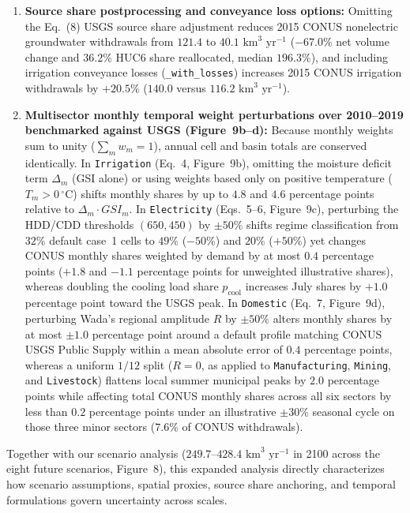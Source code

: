 \documentclass[11pt,letterpaper]{article}
\begin{document}
{\begin{enumerate}[label=\arabic*), leftmargin=1.6em, topsep=2pt, itemsep=2pt]
\begin{itemize}[leftmargin=1.4em, topsep=1pt, itemsep=1pt]
  \end{itemize}
  \item \textbf{Source share postprocessing and conveyance loss options:} Omitting the Eq.~(8) USGS source share adjustment reduces 2015 CONUS nonelectric groundwater withdrawals from $121.4$ to $40.1\text{ km}^3\text{ yr}^{-1}$ ($-67.0\%$ net volume change and $36.2\%$ HUC6 share reallocated, median $196.3\%$), and including irrigation conveyance losses (\texttt{\_with\_losses}) increases 2015 CONUS irrigation withdrawals by $+20.5\%$ ($140.0$ versus $116.2\text{ km}^3\text{ yr}^{-1}$).
  \item \textbf{Multisector monthly temporal weight perturbations over 2010--2019 benchmarked against USGS (Figure~9b--d):} Because monthly weights sum to unity ($\sum_m w_m = 1$), annual cell and basin totals are conserved identically. In \texttt{Irrigation} (Eq.~4, Figure~9b), omitting the moisture deficit term $\Delta_m$ (GSI alone) or using weights based only on positive temperature ($T_m > 0\,^{\circ}\mathrm{C}$) shifts monthly shares by up to $4.8$ and $4.6$ percentage points relative to $\Delta_m \cdot GSI_m$. In \texttt{Electricity} (Eqs.~5--6, Figure~9c), perturbing the HDD/CDD thresholds $(650, 450)$ by $\pm 50\%$ shifts regime classification from $32\%$ default case~1 cells to $49\%$ ($-50\%$) and $20\%$ ($+50\%$) yet changes CONUS monthly shares weighted by demand by at most $0.4$ percentage points ($+1.8$ and $-1.1$ percentage points for unweighted illustrative shares), whereas doubling the cooling load share $p_{\mathrm{cool}}$ increases July shares by $+1.0$ percentage point toward the USGS peak. In \texttt{Domestic} (Eq.~7, Figure~9d), perturbing Wada's regional amplitude $R$ by $\pm 50\%$ alters monthly shares by at most $\pm 1.0$ percentage point around a default profile matching CONUS USGS Public Supply within a mean absolute error of $0.4$ percentage points, whereas a uniform $1/12$ split ($R=0$, as applied to \texttt{Manufacturing}, \texttt{Mining}, and \texttt{Livestock}) flattens local summer municipal peaks by $2.0$ percentage points while affecting total CONUS monthly shares across all six sectors by less than $0.2$ percentage points under an illustrative $\pm 30\%$ seasonal cycle on those three minor sectors ($7.6\%$ of CONUS withdrawals).
\end{enumerate}
Together with our scenario analysis ($249.7\text{--}428.4\text{ km}^3\text{ yr}^{-1}$ in 2100 across the eight future scenarios, Figure~8), this expanded analysis directly characterizes how scenario assumptions, spatial proxies, source share anchoring, and temporal formulations govern uncertainty across scales.}
\end{document}
